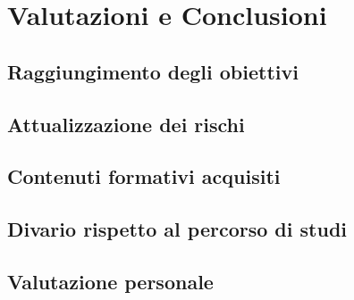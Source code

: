 \chapter{Valutazioni e Conclusioni}
\label{cap:conclusioni}
\section{Raggiungimento degli obiettivi}

\section{Attualizzazione dei rischi}

\section{Contenuti formativi acquisiti}
\section{Divario rispetto al percorso di studi}

\section{Valutazione personale}
